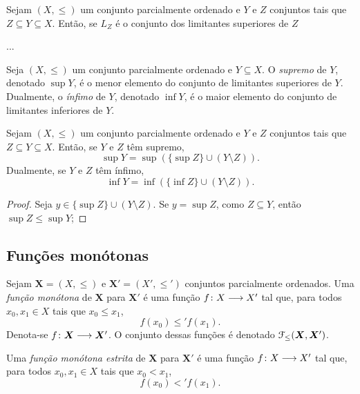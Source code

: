 \begin{proposition}
	Sejam $(X,\leq)$ um conjunto parcialmente ordenado e $Y$ e $Z$ conjuntos tais que $Z \subseteq Y \subseteq X$. Então, se $L_Z$ é o conjunto dos limitantes superiores de $Z$
	
	...
\end{proposition}

\begin{definition}
	Seja $(X,\leq)$ um conjunto parcialmente ordenado e $Y \subseteq X$. O \emph{supremo} de $Y$, denotado $\sup Y$, é o menor elemento do conjunto de limitantes superiores de $Y$. Dualmente, o \emph{ínfimo} de $Y$, denotado $\inf Y$, é o maior elemento do conjunto de limitantes inferiores de $Y$.
\end{definition}

\begin{proposition}
	Sejam $(X,\leq)$ um conjunto parcialmente ordenado e $Y$ e $Z$ conjuntos tais que $Z \subseteq Y \subseteq X$. Então, se $Y$ e $Z$ têm supremo,
	\begin{equation*}
	\sup Y = \sup(\{\sup Z\} \cup (Y \setminus Z)).
	\end{equation*}
Dualmente, se $Y$ e $Z$ têm ínfimo,
	\begin{equation*}
	\inf Y = \inf(\{\inf Z\} \cup (Y \setminus Z)).
	\end{equation*}
\end{proposition}
\begin{proof}
	Seja $y \in \{\sup Z\} \cup (Y \setminus Z)$. Se $y = \sup Z$, como $Z \subseteq Y$, então $\sup Z \leq \sup Y$; 
\end{proof}

\subsection{Funções monótonas}

\begin{definition}
	Sejam $\bm X = (X,\leq)$ e $\bm X' = (X',\leq')$ conjuntos parcialmente ordenados. Uma \emph{função monótona} de $\bm X$ para $\bm X'$ é uma função ${f}\colon {X} \longrightarrow {X'}$ tal que, para todos $x_0,x_1 \in X$ tais que $x_0 \leq x_1$,
		\begin{equation*}
		f(x_0) \leq' f(x_1).
		\end{equation*}
	Denota-se ${f}\colon {\bm X} \longrightarrow {\bm X'}$. O conjunto dessas funções é denotado $\mathcal{F}_\leq(\bm X, \bm X')$.

	Uma \emph{função monótona estrita} de $\bm X$ para $\bm X'$ é uma função ${f}\colon {X} \longrightarrow {X'}$ tal que, para todos $x_0,x_1 \in X$ tais que $x_0 < x_1$,
		\begin{equation*}
		f(x_0) <' f(x_1).
		\end{equation*}
\end{definition}

